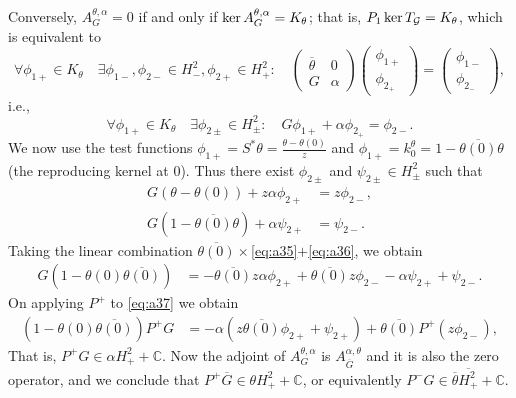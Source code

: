 \documentclass[11pt]{article}
\def\CC{\mathbb C}
\def\G{\mathcal G}
\def\ol{\overline}
\def\ker{\mathop{\rm ker}\nolimits}
\begin{document}
Conversely, $A^{\theta,\alpha}_G=0$ if and only if $\ker A^{\theta,\alpha}_G = K_\theta$; that is,
$P_1 \ker T_\G = K_\theta$, 
which is equivalent to
\[
\forall \phi_{1+} \in K_\theta \quad \exists \phi_{1-},\phi_{2-} \in H^2_-, \phi_{2+} \in H^2_+ :
\quad \begin{pmatrix} \ol\theta & 0 \\ G & \alpha \end{pmatrix} \begin{pmatrix}\phi_{1+} \\ \phi_{2_+} \end{pmatrix} =  \begin{pmatrix}\phi_{1-} \\ \phi_{2_-} \end{pmatrix},
\]
i.e.,
\[
\forall \phi_{1+} \in K_\theta \quad \exists \phi_{2 \pm} \in H^2_{\pm}: \quad G \phi_{1+} + \alpha \phi_{2_+} = \phi_{2-}. 
\]
We now use the test functions $\phi_{1+}=S^* \theta = \frac{\theta -\theta(0)}{z}$
and $\phi_{1+} = k^\theta_0 = 1-\ol{\theta(0)}\theta$ (the reproducing kernel at $0$). Thus
there exist $\phi_{2\pm}$ and $\psi_{2\pm} \in H^2_\pm$ such that
\begin{align}
G(\theta-\theta(0))+ z \alpha \phi_{2+}  &= z\phi_{2-},\label{eq:a35}
\\
G(1-\ol{\theta(0)}\theta) + \alpha \psi_{2+} &= \psi_{2-}.\label{eq:a36}
\end{align}
Taking the linear combination
$\ol{\theta(0)}\times$\eqref{eq:a35}$+$\eqref{eq:a36},
we obtain
\begin{align}
G(1-\theta(0)\ol{\theta(0)}) & = -\ol{\theta(0)}z\alpha \phi_{2+}+\ol{\theta(0)}z\phi_{2-} -\alpha \psi_{2+}+\psi_{2-}\label{eq:a37}.
\end{align}
On applying $P^+$ to  \eqref{eq:a37} 
we obtain
\begin{align}
(1-\theta(0)\ol{\theta(0)}) P^+ G &= -\alpha(z  \ol{\theta(0)}\phi_{2+}+\psi_{2+})+ \ol{\theta(0)}P^+(z \phi_{2-}), \label{eq:a39}
\end{align}
That is, $P^+ G \in \alpha H^2_+ + \CC$. Now the adjoint of $A^{\theta,\alpha}_G$ is
$A^{\alpha,\theta}_{\ol G}$ and it is also the zero operator, and we conclude that
$P^+ \ol G \in \theta H^2_+ + \CC$, or equivalently $P^- G \in \ol \theta \ol{H^2_+}+\CC$.
\end{document}
